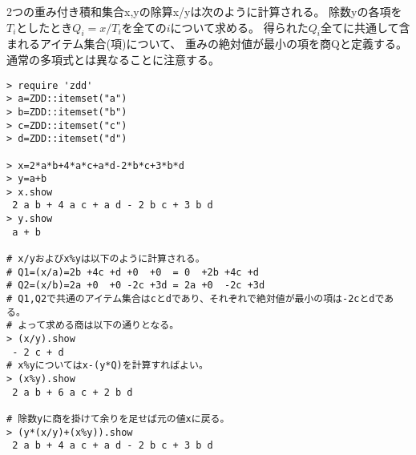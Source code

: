 2つの重み付き積和集合x,yの除算x/yは次のように計算される。
除数yの各項を$T_i$としたとき$Q_i=x/T_i$を全ての$i$について求める。
得られた$Q_i$全てに共通して含まれるアイテム集合(項)について、
重みの絶対値が最小の項を商Qと定義する。
通常の多項式とは異なることに注意する。


\begin{Verbatim}[baselinestretch=0.7,frame=single]
> require 'zdd'
> a=ZDD::itemset("a")
> b=ZDD::itemset("b")
> c=ZDD::itemset("c")
> d=ZDD::itemset("d")

> x=2*a*b+4*a*c+a*d-2*b*c+3*b*d
> y=a+b
> x.show
 2 a b + 4 a c + a d - 2 b c + 3 b d
> y.show
 a + b

# x/yおよびx%yは以下のように計算される。
# Q1=(x/a)=2b +4c +d +0  +0  = 0  +2b +4c +d
# Q2=(x/b)=2a +0  +0 -2c +3d = 2a +0  -2c +3d
# Q1,Q2で共通のアイテム集合はcとdであり、それぞれで絶対値が最小の項は-2cとdである。
# よって求める商は以下の通りとなる。
> (x/y).show
 - 2 c + d
# x%yについてはx-(y*Q)を計算すればよい。
> (x%y).show
 2 a b + 6 a c + 2 b d

# 除数yに商を掛けて余りを足せば元の値xに戻る。
> (y*(x/y)+(x%y)).show
 2 a b + 4 a c + a d - 2 b c + 3 b d
\end{Verbatim}
